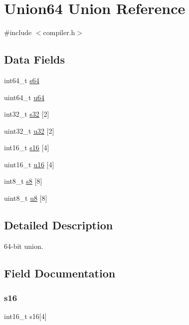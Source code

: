 \hypertarget{union_union64}{}\section{Union64 Union Reference}
\label{union_union64}


{\ttfamily \#include $<$compiler.\+h$>$}

\subsection*{Data Fields}
\begin{DoxyCompactItemize}
\item 
int64\+\_\+t \mbox{\hyperlink{union_union64_ae66ed2ec20c2115ff9970c73168fc0df}{s64}}
\item 
uint64\+\_\+t \mbox{\hyperlink{union_union64_a91ee3b6e2425e78feef03fb5c69d63e5}{u64}}
\item 
int32\+\_\+t \mbox{\hyperlink{union_union64_a0ba0e62932ccd54572528b1fc2a1f0c6}{s32}} \mbox{[}2\mbox{]}
\item 
uint32\+\_\+t \mbox{\hyperlink{union_union64_a5f1c08f37d62cec9dcbde61da03a49b0}{u32}} \mbox{[}2\mbox{]}
\item 
int16\+\_\+t \mbox{\hyperlink{union_union64_af11257d0836c93a71df892e33a6ba3aa}{s16}} \mbox{[}4\mbox{]}
\item 
uint16\+\_\+t \mbox{\hyperlink{union_union64_a0e0a02dc77a71e1e9914218da2a420f4}{u16}} \mbox{[}4\mbox{]}
\item 
int8\+\_\+t \mbox{\hyperlink{union_union64_a9e5aec8f4aadc6ee8abf3333ca15ecb9}{s8}} \mbox{[}8\mbox{]}
\item 
uint8\+\_\+t \mbox{\hyperlink{union_union64_afb01169b5cea6662c70b70de797d5b8e}{u8}} \mbox{[}8\mbox{]}
\end{DoxyCompactItemize}


\subsection{Detailed Description}
64-\/bit union. 

\subsection{Field Documentation}
\mbox{\label{union_union64_af11257d0836c93a71df892e33a6ba3aa}} 
\subsubsection{\texorpdfstring{s16}{s16}}
{\footnotesize\ttfamily int16\+\_\+t s16\mbox{[}4\mbox{]}}

